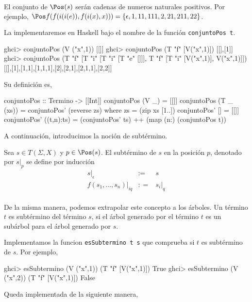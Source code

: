 El conjunto de $\Pos(s)$ serán cadenas de numeros naturales
positivos. Por ejemplo,
$\Pos f(f(i(i(e)),f(i(x),x))) = \{ \epsilon,1,11,111,2,21,211,22 \}$.

La implementaremos en Haskell bajo el nombre de la función \texttt{conjuntoPos t}.

\begin{sesion}
ghci> conjuntoPos (V ("x",1))
[[]]
ghci> conjuntoPos (T "f" [V("x",1)])
[[],[1]]
ghci> conjuntoPos (T "f" [T "i" [T "i" [T "e" []]],
                   T "f" [T "i" [V("x",1)], V("x",1)]])
[[],[1],[1,1],[1,1,1],[2],[2,1],[2,1,1],[2,2]]
\end{sesion}

Su definición es,

\begin{codigo}
conjuntoPos :: Termino -> [[Int]]
conjuntoPos (V _) = [[]]
conjuntoPos (T _ (xs)) = conjuntoPos' (reverse zs)
    where zs = (zip xs [1..])
          conjuntoPos' [] = [[]]
          conjuntoPos' ((t,n):ts) = (conjuntoPos' ts) ++ 
                                    (map (n:) (conjuntoPos t))
\end{codigo}


A continuación, introducimos la noción de subtérmino.
\begin{defi}
  Sea $s \in T(\Sigma, X)$ y $p \in \Pos (s)$. El subtérmino de $s$ en
  la posición $p$, denotado por $s|_p$ se define por inducción
  \begin{equation*}
    \begin{array}{rcl}
      s|_\epsilon & :=  & s \\
      f(s_1,\dots,s_n)|_{iq} & : = & s_i|_q \\
    \end{array}
  \end{equation*}
\end{defi}

De la misma manera, podemos extrapolar este concepto a los árboles. Un
término $t$ es subtérmino del término $s$, si el árbol generado por el
término $t$ es un subárbol para el árbol generado por $s$. 

Implementamos la funcion \texttt{esSubtermino t s} que comprueba si $t$ es
subtérmino de $s$. Por ejemplo,

\begin{sesion}
ghci> esSubtermino (V ("x",1)) (T "f" [V("x",1)])
True
ghci> esSubtermino (V ("x",2)) (T "f" [V("x",1)])
False
\end{sesion}

Queda implementada de la siguiente manera,

